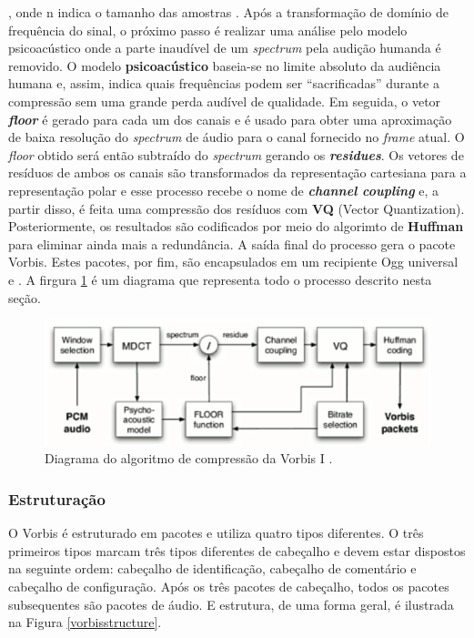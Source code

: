 , onde n indica o tamanho das amostras \cite{vorbis}. Após a transformação de domínio de frequência do sinal, o próximo passo é realizar uma análise pelo modelo psicoacústico onde a parte inaudível de um \textit{spectrum} pela audição humanda é removido. O modelo \textbf{psicoacústico} baseia-se no limite absoluto da audiência humana e, assim, indica quais frequências podem ser ``sacrificadas'' durante a compressão sem uma grande perda audível de qualidade. Em seguida, o vetor \textbf{\textit{floor}} é gerado para cada um dos canais e é usado para obter uma aproximação de baixa resolução do \textit{spectrum} de áudio para o canal fornecido no \textit{frame} atual. O \textit{floor} obtido será então subtraído do \textit{spectrum} gerando os \textbf{\textit{residues}}. Os vetores de resíduos de ambos os canais são transformados da representação cartesiana para a representação polar e esse processo recebe o nome de \textbf{\textit{channel coupling}} e, a partir disso, é feita uma compressão dos resíduos com \textbf{VQ} (Vector Quantization). Posteriormente, os resultados são codificados por meio do algorimto de \textbf{Huffman} para eliminar ainda mais a redundância. A saída final do processo gera o pacote Vorbis. Estes pacotes, por fim, são encapsulados em um recipiente Ogg universal \cite{algoritmocompressao} e \cite{vorbis}. A firgura \ref{algorithm} é um diagrama que representa todo o processo descrito nesta seção.

\begin{figure}[ht]
	\centering
		\includegraphics[keepaspectratio=true,scale=0.8]{figuras/algorithm.eps}
	\caption{Diagrama do algoritmo de compressão da Vorbis I \cite{algoritmocompressao}.}
	\label{algorithm}
\end{figure}

\subsubsection{Estruturação}

O Vorbis é estruturado em pacotes e utiliza quatro tipos diferentes. O três primeiros tipos marcam três tipos diferentes de cabeçalho e devem estar dispostos na seguinte ordem: cabeçalho de identificação, cabeçalho de comentário e cabeçalho de configuração. Após os três pacotes de cabeçalho, todos os pacotes subsequentes são pacotes de áudio. E estrutura, de uma forma geral, é ilustrada na Figura \ref{vorbisstructure}.

